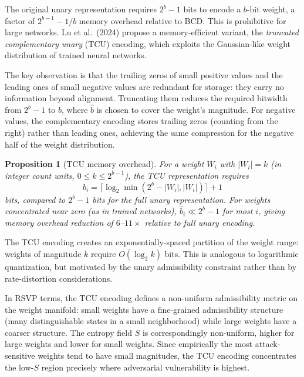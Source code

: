 \documentclass[11pt, openright, twoside]{book}
\theoremstyle{plain}
\newtheorem{proposition}[theorem]{Proposition}
\theoremstyle{definition}
\theoremstyle{remark}
\newcommand{\Sfield}{S}
\begin{document}
The original unary representation requires $2^b - 1$ bits to encode a $b$-bit weight,
a factor of $2^{b-1}-1/b$ memory overhead relative to BCD. This is prohibitive for
large networks. Lu et al.\ (2024) propose a memory-efficient variant, the
\emph{truncated complementary unary} (TCU) encoding, which exploits the Gaussian-like
weight distribution of trained neural networks.

The key observation is that the trailing zeros of small positive values and the leading
ones of small negative values are redundant for storage: they carry no information beyond
alignment. Truncating them reduces the required bitwidth from $2^b-1$ to $\hat b$, where
$\hat b$ is chosen to cover the weight's magnitude. For negative values, the complementary
encoding stores trailing zeros (counting from the right) rather than leading ones,
achieving the same compression for the negative half of the weight distribution.

\begin{proposition}[TCU memory overhead]
For a weight $W_i$ with $|W_i| = k$ (in integer count units, $0 \leq k \leq 2^{b-1}$),
the TCU representation requires
\begin{equation}
  \hat b_i = \lceil\log_2\min(2^b - |W_i|, |W_i|)\rceil + 1
  \label{eq:tcu_bits}
\end{equation}
bits, compared to $2^b - 1$ bits for the full unary representation. For weights
concentrated near zero (as in trained networks), $\hat b_i \ll 2^b - 1$ for most $i$,
giving memory overhead reduction of $6$--$11\times$ relative to full unary encoding.
\end{proposition}

The TCU encoding creates an exponentially-spaced partition of the weight range: weights
of magnitude $k$ require $O(\log_2 k)$ bits. This is analogous to logarithmic
quantization, but motivated by the unary admissibility constraint rather than by
rate-distortion considerations.

In RSVP terms, the TCU encoding defines a non-uniform admissibility metric on the weight
manifold: small weights have a fine-grained admissibility structure (many distinguishable
states in a small neighborhood) while large weights have a coarser structure. The
entropy field $\Sfield$ is correspondingly non-uniform, higher for large weights and
lower for small weights. Since empirically the most attack-sensitive weights tend to have
small magnitudes, the TCU encoding concentrates the low-$\Sfield$ region precisely
where adversarial vulnerability is highest.
\end{document}
